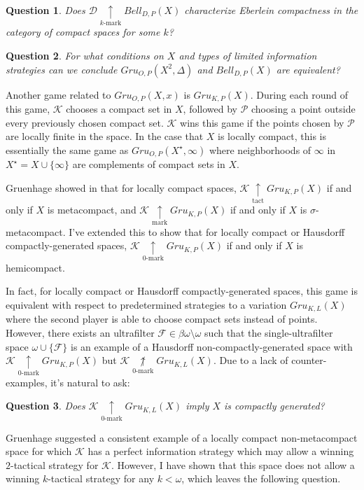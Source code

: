 \documentclass[11pt]{amsart}
\theoremstyle{plain}
\newtheorem{question}{Question}
\newcommand{\markwin}{\underset{\text{mark}}{\uparrow}}
\newcommand{\tactwin}{\underset{\text{tact}}{\uparrow}}
\newcommand{\kmarkwin}[1]{\underset{#1\text{-mark}}{\uparrow}}
\newcommand{\notkmarkwin}[1]{\underset{#1\text{-mark}}{\not\uparrow}}
\newcommand{\oneptcomp}[1]{#1^\star}
\newcommand{\gruConGame}[2]{Gru_{O,P}(#1,#2)}
\newcommand{\gruKPGame}[1]{Gru_{K,P}(#1)}
\newcommand{\gruKLGame}[1]{Gru_{K,L}(#1)}
\newcommand{\bellConGame}[1]{Bell_{D,P}(#1)}
\newcommand{\<}{\langle}
\renewcommand{\>}{\rangle}
\newcommand{\mc}[1]{\mathcal{#1}}
\newcommand{\pl}[1]{\mathscr{#1}}
\begin{document}
\begin{question}
  Does $\pl D\kmarkwin{k}\bellConGame{X}$
  characterize Eberlein compactness in the category of compact spaces
  for some $k$?
\end{question}

\begin{question}
  For what conditions on $X$ and types of limited information strategies
  can we conclude $\gruConGame{X^2}{\Delta}$ and $\bellConGame{X}$ are
  equivalent?
\end{question}

Another game related to $\gruConGame{X}{x}$ is $\gruKPGame{X}$. During each
round of this game, $\pl K$ chooses a compact set in $X$, followed by
$\pl P$ choosing a point outside every previously chosen compact set. $\pl K$
wins this game if the points chosen by $\pl P$ are locally finite in the
space. In the case that $X$ is locally compact, this is essentially the
same game as $\gruConGame{\oneptcomp X}{\infty}$ where neighborhoods of
$\infty$ in $\oneptcomp X=X\cup\{\infty\}$ are complements of compact sets
in $X$.

Gruenhage showed in \cite{MR858337} that for locally compact spaces,
$\pl K\tactwin\gruKPGame{X}$ if and
only if $X$ is metacompact, and $\pl K\markwin\gruKPGame{X}$ if and only if
$X$ is $\sigma$-metacompact. I've extended this to show that for locally
compact or Hausdorff compactly-generated spaces,
$\pl K\kmarkwin0\gruKPGame{X}$ if and only if $X$ is hemicompact.

In fact, for
locally compact or Hausdorff compactly-generated spaces, this game is
equivalent with respect to predetermined strategies to a variation
$\gruKLGame{X}$ where the second player is able to choose compact sets
instead of points. However, there exists an ultrafilter
$\mc F\in\beta\omega\setminus\omega$ such that the single-ultrafilter space
$\omega\cup\{\mc F\}$
is an example of a Hausdorff non-compactly-generated space with
$\pl K\kmarkwin0\gruKPGame{X}$ but $\pl K\notkmarkwin0\gruKLGame{X}$. Due to a lack
of counter-examples, it's natural to ask:

\begin{question}
  Does $\pl K\kmarkwin0\gruKLGame{X}$ imply $X$ is compactly generated?
\end{question}

Gruenhage suggested a consistent example of a locally compact non-metacompact
space for which $\pl K$ has a perfect information strategy which may allow
a winning $2$-tactical strategy for $\pl K$. However, I have shown that this
space does not allow a winning $k$-tactical strategy for any $k<\omega$, which
leaves the following question.
\end{document}
